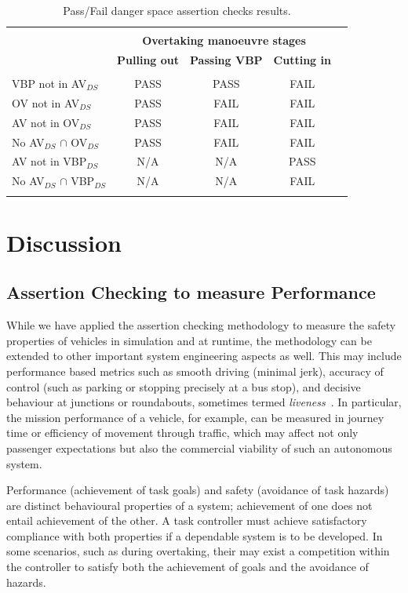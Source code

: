 \begin{table}[h]
\centering
\begin{tabular}{ lcccc }
\hline
\\
\multirow{3}{*}{\textbf{}} & \multicolumn{3}{c}{\textbf{Overtaking manoeuvre stages}}\\
\textbf{Assertion} & \textbf{Pulling out} & \textbf{Passing VBP} & \textbf{Cutting in} & \\
&  &  &  & \\
VBP not in AV$_{DS}$ & PASS & PASS & FAIL\\
%
OV not in AV$_{DS}$ & PASS & FAIL & FAIL\\
%
AV not in OV$_{DS}$  & PASS & FAIL & FAIL\\
%
No AV$_{DS}$ $\cap$ OV$_{DS}$  & PASS & FAIL & FAIL\\
%
AV not in VBP$_{DS}$  & N/A & N/A & PASS\\
%
No AV$_{DS}$ $\cap$ VBP$_{DS}$  & N/A & N/A & FAIL\\
%
\\
\hline
\end{tabular}
\caption{Pass/Fail danger space assertion checks results.} \label{Overtaking_DS_table}
\end{table}

\section{Discussion} \label{discussion}

\subsection{Assertion Checking to measure Performance}
While we have applied the assertion checking methodology to measure the safety properties of vehicles in simulation and at runtime, the methodology can be extended to other important system engineering aspects as well. This may include performance based metrics such as smooth driving (minimal jerk), accuracy of control (such as parking or stopping precisely at a bus stop), and decisive behaviour at junctions or roundabouts, sometimes termed \emph{liveness}~\cite{kim2014mpc}. 
%
In particular, the mission performance of a vehicle, for example, can be measured in journey time or efficiency of movement through traffic, which may affect not only passenger expectations but also the commercial viability of such an autonomous system. 

Performance (achievement of task goals) and safety (avoidance of task hazards) are distinct behavioural properties of a system; achievement of one does not entail achievement of the other. A task controller must achieve satisfactory compliance with both properties if a dependable system is to be developed. In some scenarios, such as during overtaking, their may exist a competition within the controller to satisfy both the achievement of goals and the avoidance of hazards. 

